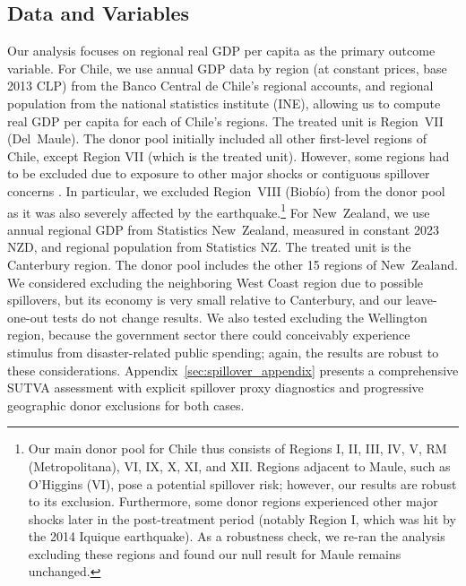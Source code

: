 \documentclass[12pt]{article}
\begin{document}
\subsection{Data and Variables}
Our analysis focuses on regional real GDP per capita as the primary outcome variable. For Chile, we use annual GDP data by region (at constant prices, base 2013 CLP) from the Banco Central de Chile’s regional accounts, and regional population from the national statistics institute (INE), allowing us to compute real GDP per capita for each of Chile’s regions. The treated unit is Region VII (Del Maule). The donor pool initially included all other first-level regions of Chile, except Region VII (which is the treated unit). However, some regions had to be excluded due to exposure to other major shocks or contiguous spillover concerns \parencite{abadie2010synthetic, abadie2021jel}. In particular, we excluded Region VIII (Biobío) from the donor pool as it was also severely affected by the earthquake.\footnote{Our main donor pool for Chile thus consists of Regions I, II, III, IV, V, RM (Metropolitana), VI, IX, X, XI, and XII. Regions adjacent to Maule, such as O’Higgins (VI), pose a potential spillover risk; however, our results are robust to its exclusion. Furthermore, some donor regions experienced other major shocks later in the post-treatment period (notably Region I, which was hit by the 2014 Iquique earthquake). As a robustness check, we re-ran the analysis excluding these regions and found our null result for Maule remains unchanged.} For New Zealand, we use annual regional GDP from Statistics New Zealand, measured in constant 2023 NZD, and regional population from Statistics NZ. The treated unit is the Canterbury region. The donor pool includes the other 15 regions of New Zealand. We considered excluding the neighboring West Coast region due to possible spillovers, but its economy is very small relative to Canterbury, and our leave-one-out tests do not change results. We also tested excluding the Wellington region, because the government sector there could conceivably experience stimulus from disaster-related public spending; again, the results are robust to these considerations. Appendix~\ref{sec:spillover_appendix} presents a comprehensive SUTVA assessment with explicit spillover proxy diagnostics and progressive geographic donor exclusions for both cases.
\end{document}
